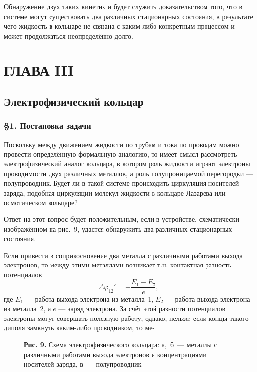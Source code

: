 \documentclass[12pt,a4paper]{article}
\begin{document}
Обнаружение двух таких кинетик и будет служить доказательством того, что в
системе могут существовать два различных стационарных состояния, в результате
чего жидкость в кольцаре не связана с каким-либо конкретным процессом и может
продолжаться неопределённо долго.

\newpage
\section*{ГЛАВА III}
\subsection*{Электрофизический кольцар}

\subsubsection*{§1. Постановка задачи}

Поскольку между движением жидкости по трубам и тока по проводам можно провести
определённую формальную аналогию, то имеет смысл рассмотреть электрофизический
аналог кольцара, в котором роль жидкости играют электроны проводимости двух
различных металлов, а роль полупроницаемой перегородки — полупроводник.
Будет ли в такой системе происходить циркуляция носителей заряда, подобная
циркуляции молекул жидкости в кольцаре Лазарева или осмотическом кольцаре?

Ответ на этот вопрос будет положительным, если в устройстве, схематически
изображённом на рис.~9, удастся обнаружить два различных стационарных состояния.

Если привести в соприкосновение два металла с различными работами выхода
электронов, то между этими металлами возникает т.н. контактная разность
потенциалов
\begin{equation}
\Delta\varphi_{12}' = -\frac{E_1 - E_2}{e}, \label{eq:7}
\end{equation}
где $E_1$ — работа выхода электрона из металла~1, $E_2$ — работа выхода
электрона из металла~2, а $e$ — заряд электрона. За счёт этой разности
потенциалов электроны могут совершать полезную работу, однако, нельзя: если
концы такого диполя замкнуть каким-либо проводником, то ме-

\begin{figure}[h]
\centering
\caption*{\textbf{Рис. 9.} Схема электрофизического кольцара: а,~б~— металлы
с различными работами выхода электронов и концентрациями носителей заряда,
в~— полупроводник}
\end{figure}
\end{document}
